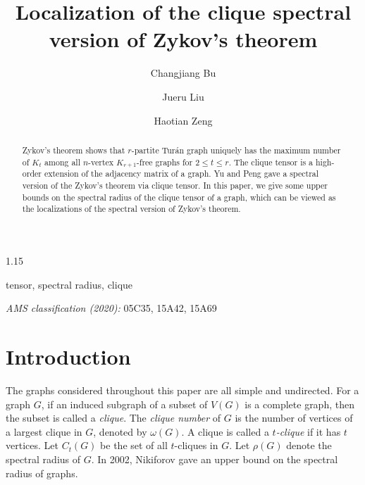 \documentclass[preprint,12pt]{elsarticle1}
\numberwithin{equation}{section}
\begin{document}
\begin{spacing}{1.15}
\begin{frontmatter}
\title{\textbf{Localization of the clique spectral version of Zykov's theorem}}


\author[1]{Changjiang Bu}
\author[1]{Jueru Liu}
\author[1]{Haotian Zeng}
\address[1]{School of Mathematical Sciences, Harbin Engineering University, Harbin 150001, PR China}




\begin{abstract}
Zykov's theorem shows that $r$-partite Tur\'{a}n graph uniquely has the maximum number of $K_t$ among all $n$-vertex $K_{r+1}$-free graphs for $2\le t\le r$.
The clique tensor is a high-order extension of the adjacency matrix of a graph.
Yu and Peng \cite{peng1} gave a spectral version of the Zykov's theorem via clique tensor.
In this paper, we give some upper bounds on the spectral radius of the clique tensor of a graph, which can be viewed as the localizations of the spectral version of Zykov's theorem.
\end{abstract}


\begin{keyword}
tensor, spectral radius, clique

\emph{AMS classification (2020):}
05C35, 15A42, 15A69
\end{keyword}
\end{frontmatter}


\section{Introduction}
The graphs considered throughout this paper are all simple and undirected.
For a graph $G$, if an induced subgraph of a subset of $V(G)$ is a complete graph, then the subset is called a \textit{clique}.
The \textit{clique number} of $G$ is the number of vertices of a largest clique in $G$, denoted by $\omega(G)$.
A clique is called a \textit{$t$-clique} if it has $t$ vertices.
Let $C_{t}(G)$ be the set of all $t$-cliques in $G$.
Let $\rho(G)$ denote the spectral radius of $G$.
In 2002, Nikiforov \cite{nikiforov2002} gave an upper bound on the spectral radius of graphs.


\end{spacing}
\end{document}
